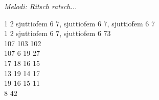 {\footnotesize\textit{Melodi: Ritsch ratsch...}}\par
\vspace{10pt}
1 2 sjuttiofem 6 7, sjuttiofem 6 7, sjuttiofem 6 7\\
1 2 sjuttiofem 6 7, sjuttiofem 6 73\\
107 103 102\\
107 6 19 27\\
17 18 16 15\\
13 19 14 17\\
19 16 15 11\\
8 42
